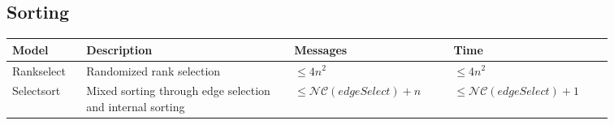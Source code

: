 \subsection{Sorting}
\begin{table}[h]
\begin{tabular}{p{0.1\linewidth} p{0.3\linewidth} p{0.23\linewidth} p{0.23\linewidth}}
			\textbf{Model}		& \textbf{Description}					& \textbf{Messages}				& \textbf{Time} \\
	\hline 	Rankselect 			& Randomized rank selection				& $\leq 4n^2$					& $\leq 4n^2$ \\
	\hline 	Selectsort 			& Mixed sorting through edge selection and internal sorting
																		& $\leq \mathcal{N}\mathcal{C}(edgeSelect) + n$
																										& $\leq \mathcal{N}\mathcal{C}(edgeSelect) + 1$ \\
\end{tabular}
\end{table}